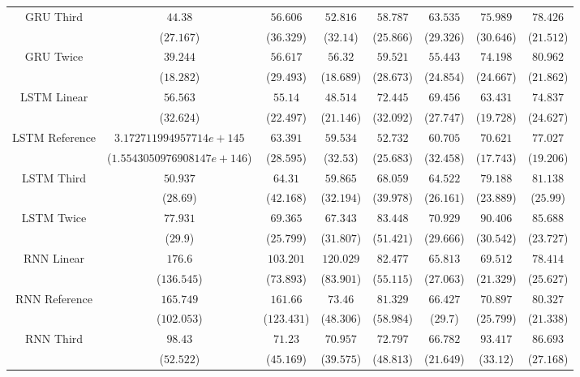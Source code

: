 \begin{table}[!ht]
{\begin{tabular}{|c|c|c|c|c|c|c|c|}
			\multirow{2}{*}{GRU Third} & $44.38$ & $56.606$ & $52.816$ & $58.787$ & $63.535$ & $75.989$ & $78.426$ \\
			 & ($27.167$) & ($36.329$) & ($32.14$) & ($25.866$) & ($29.326$) & ($30.646$) & ($21.512$) \\ \hline
			\multirow{2}{*}{GRU Twice} & $39.244$ & $56.617$ & $56.32$ & $59.521$ & $55.443$ & $74.198$ & $80.962$ \\
			 & ($18.282$) & ($29.493$) & ($18.689$) & ($28.673$) & ($24.854$) & ($24.667$) & ($21.862$) \\ \hline
			\multirow{2}{*}{LSTM Linear} & $56.563$ & $55.14$ & $48.514$ & $72.445$ & $69.456$ & $63.431$ & $74.837$ \\
			 & ($32.624$) & ($22.497$) & ($21.146$) & ($32.092$) & ($27.747$) & ($19.728$) & ($24.627$) \\ \hline
			\multirow{2}{*}{LSTM Reference} & $3.172711994957714e+145$ & $63.391$ & $59.534$ & $52.732$ & $60.705$ & $70.621$ & $77.027$ \\
			 & ($1.5543050976908147e+146$) & ($28.595$) & ($32.53$) & ($25.683$) & ($32.458$) & ($17.743$) & ($19.206$) \\ \hline
			\multirow{2}{*}{LSTM Third} & $50.937$ & $64.31$ & $59.865$ & $68.059$ & $64.522$ & $79.188$ & $81.138$ \\
			 & ($28.69$) & ($42.168$) & ($32.194$) & ($39.978$) & ($26.161$) & ($23.889$) & ($25.99$) \\ \hline
			\multirow{2}{*}{LSTM Twice} & $77.931$ & $69.365$ & $67.343$ & $83.448$ & $70.929$ & $90.406$ & $85.688$ \\
			 & ($29.9$) & ($25.799$) & ($31.807$) & ($51.421$) & ($29.666$) & ($30.542$) & ($23.727$) \\ \hline
			\multirow{2}{*}{RNN Linear} & $176.6$ & $103.201$ & $120.029$ & $82.477$ & $65.813$ & $69.512$ & $78.414$ \\
			 & ($136.545$) & ($73.893$) & ($83.901$) & ($55.115$) & ($27.063$) & ($21.329$) & ($25.627$) \\ \hline
			\multirow{2}{*}{RNN Reference} & $165.749$ & $161.66$ & $73.46$ & $81.329$ & $66.427$ & $70.897$ & $80.327$ \\
			 & ($102.053$) & ($123.431$) & ($48.306$) & ($58.984$) & ($29.7$) & ($25.799$) & ($21.338$) \\ \hline
			\multirow{2}{*}{RNN Third} & $98.43$ & $71.23$ & $70.957$ & $72.797$ & $66.782$ & $93.417$ & $86.693$ \\
			 & ($52.522$) & ($45.169$) & ($39.575$) & ($48.813$) & ($21.649$) & ($33.12$) & ($27.168$) \\ \hline

\end{tabular}}
\end{table}
